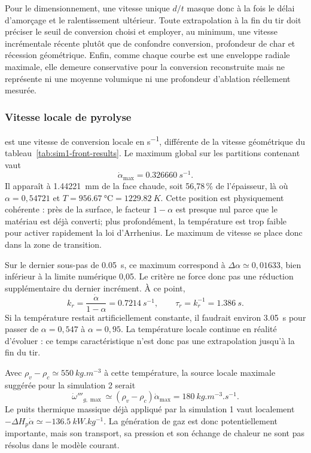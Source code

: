 \documentclass[oneside,openany]{amsdtx}
\begin{document}
Pour le dimensionnement, une vitesse unique \(d/t\) masque donc à la fois le
délai d'amorçage et le ralentissement ultérieur. Toute extrapolation à la fin du
tir doit préciser le seuil de conversion choisi et employer, au minimum, une
vitesse incrémentale récente plutôt que de confondre conversion, profondeur de
char et récession géométrique. Enfin, comme chaque courbe est une enveloppe
radiale maximale, elle demeure conservative pour la conversion reconstruite
mais ne représente ni une moyenne volumique ni une profondeur d'ablation
réellement mesurée.

\subsubsection{Vitesse locale de pyrolyse }

 est une vitesse de conversion locale en \si{s^{-1}}, différente
de la vitesse géométrique du tableau~\ref{tab:sim1-front-results}. Le maximum
global sur les partitions contenant  vaut
\[
  \boxed{\dot\alpha_\mathrm{max}=\SI{0.326660}{s^{-1}}.}
\]
Il apparaît à \SI{1.44221}{mm} de la face chaude, soit 56,78\,\% de
l'épaisseur, là où \(\alpha=0{,}54721\) et
\(T=\SI{956.67}{\degreeCelsius}=\SI{1229.82}{K}\). Cette position est
physiquement cohérente : près de la surface, le facteur \(1-\alpha\) est
presque nul parce que le matériau est déjà converti; plus profondément, la
température est trop faible pour activer rapidement la loi d'Arrhenius. Le
maximum de vitesse se place donc dans la zone de transition.

Sur le dernier sous-pas de \SI{0.05}{s}, ce maximum correspond à
\(\Delta\alpha\simeq0{,}01633\), bien inférieur à la limite numérique 0,05.
Le critère  ne force donc pas une réduction supplémentaire du
dernier incrément. À ce point,
\[
  k_r=\frac{\dot\alpha}{1-\alpha}=\SI{0.7214}{s^{-1}},
  \qquad \tau_r=k_r^{-1}=\SI{1.386}{s}.
\]
Si la température restait artificiellement constante, il faudrait environ
\SI{3.05}{s} pour passer de \(\alpha=0{,}547\) à \(\alpha=0{,}95\).
La température locale continue en réalité d'évoluer : ce temps caractéristique
n'est donc pas une extrapolation jusqu'à la fin du tir.

Avec \(\rho_v-\rho_c\simeq\SI{550}{kg.m^{-3}}\) à cette température, la source
locale maximale suggérée pour la simulation 2 serait
\[
  \dot\omega'''_{g,\max}\simeq
  (\rho_v-\rho_c)\dot\alpha_\mathrm{max}
  =\SI{180}{kg.m^{-3}.s^{-1}}.
\]
Le puits thermique massique déjà appliqué par la simulation 1 vaut localement
\(-\Delta H_p\dot\alpha\simeq-\SI{136.5}{kW.kg^{-1}}\). La génération de gaz
est donc potentiellement importante, mais son transport, sa pression et son
échange de chaleur ne sont pas résolus dans le modèle courant.~\\
\end{document}
